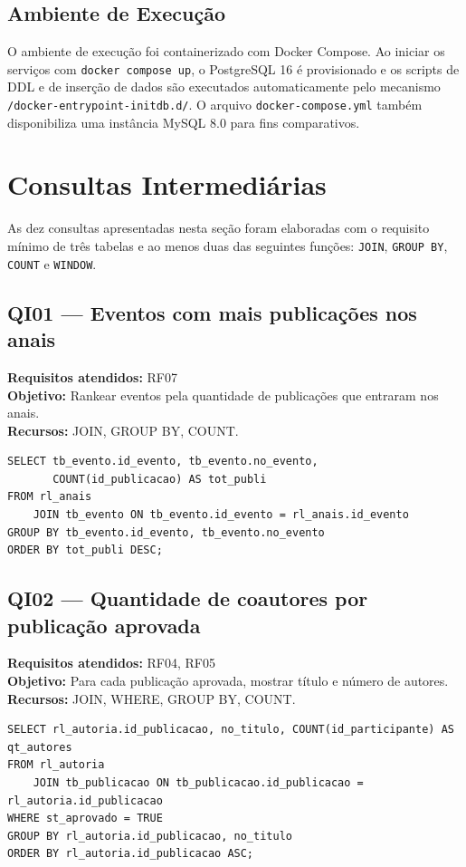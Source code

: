 \documentclass[12pt,a4paper]{article}
\begin{document}
\subsection{Ambiente de Execução}
\label{subsec:docker}

O ambiente de execução foi containerizado com Docker Compose. Ao iniciar os serviços com \texttt{docker compose up}, o PostgreSQL 16 é provisionado e os scripts de DDL e de inserção de dados são executados automaticamente pelo mecanismo \texttt{/docker-entrypoint-initdb.d/}. O arquivo \texttt{docker-compose.yml} também disponibiliza uma instância MySQL 8.0 para fins comparativos.

\section{Consultas Intermediárias}
\label{sec:consultas}

As dez consultas apresentadas nesta seção foram elaboradas com o requisito mínimo de três tabelas e ao menos duas das seguintes funções: \texttt{JOIN}, \texttt{GROUP BY}, \texttt{COUNT} e \texttt{WINDOW}.

\subsection{QI01 --- Eventos com mais publicações nos anais}
\textbf{Requisitos atendidos:} RF07 \\
\textbf{Objetivo:} Rankear eventos pela quantidade de publicações que entraram nos anais.\\
\textbf{Recursos:} JOIN, GROUP BY, COUNT.
\begin{lstlisting}[caption={QI01 -- Eventos com mais publicações nos anais.}]
SELECT tb_evento.id_evento, tb_evento.no_evento,
       COUNT(id_publicacao) AS tot_publi
FROM rl_anais
    JOIN tb_evento ON tb_evento.id_evento = rl_anais.id_evento
GROUP BY tb_evento.id_evento, tb_evento.no_evento
ORDER BY tot_publi DESC;
\end{lstlisting}

\subsection{QI02 --- Quantidade de coautores por publicação aprovada}
\textbf{Requisitos atendidos:} RF04, RF05 \\
\textbf{Objetivo:} Para cada publicação aprovada, mostrar título e número de autores.\\
\textbf{Recursos:} JOIN, WHERE, GROUP BY, COUNT.
\begin{lstlisting}[caption={QI02 -- Coautores por publicação aprovada.}]
SELECT rl_autoria.id_publicacao, no_titulo, COUNT(id_participante) AS qt_autores
FROM rl_autoria
    JOIN tb_publicacao ON tb_publicacao.id_publicacao = rl_autoria.id_publicacao
WHERE st_aprovado = TRUE
GROUP BY rl_autoria.id_publicacao, no_titulo
ORDER BY rl_autoria.id_publicacao ASC;
\end{lstlisting}
\end{document}
